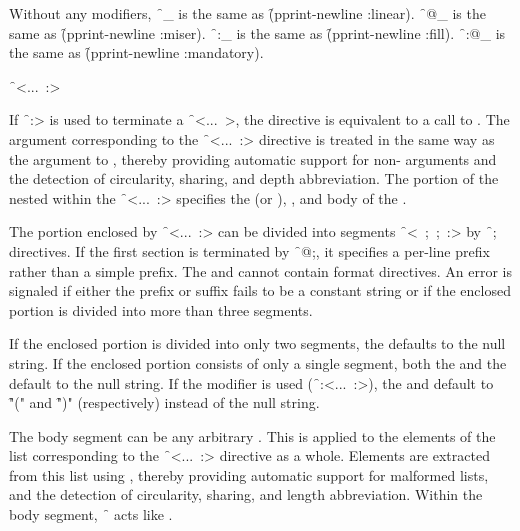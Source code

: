 Without any modifiers, \f{~_} is the same as \f{(pprint-newline :linear)}.
\f{~@_}  is the same as \f{(pprint-newline :miser)}.
\f{~:_}  is the same as \f{(pprint-newline :fill)}.
\f{~:@_} is the same as \f{(pprint-newline :mandatory)}.

\endsubsubsection%


\f{~<...~:>}

If \f{~:>} is used to terminate a \f{~<...~>},
the directive is equivalent to a call to .
The argument corresponding to the \f{~<...~:>} directive is treated in
the same way as the  argument to ,
thereby providing automatic support for non- arguments and
the detection of circularity, sharing, and depth abbreviation.  
The portion of the  nested within the \f{~<...~:>}
specifies the  (or ), ,
and body of the .
 
The  portion enclosed by \f{~<...~:>} can be divided
into segments \f{~<~;~;~:>}
by \f{~;} directives.  If the first section is terminated by \f{~@;}, 
it specifies a per-line prefix rather than a simple prefix.  
The  and  cannot contain format directives.  
An error is signaled if either the prefix or suffix fails to be a
constant string or if the enclosed portion is divided into more than three segments.
 
If the enclosed portion is divided into only two segments, the 
defaults to the null string.  If the enclosed portion consists of only
a single segment, both the  and the  default to 
the null string.  If the  modifier is used (\ie \f{~:<...~:>}),
the  and  default to \f{"("} and \f{")"}
(respectively) instead of the null string.
 
The body segment can be any arbitrary .
This  is applied to the elements of the list
corresponding to the \f{~<...~:>} directive as a whole.
Elements are extracted from this list using ,
thereby providing automatic support for malformed lists, and the detection
of circularity, sharing, and length abbreviation.
Within the body segment, \f{~{\hat}} acts like .
 
